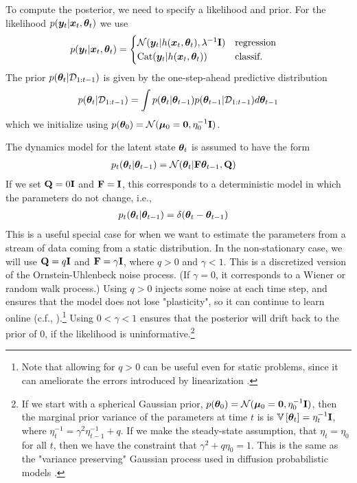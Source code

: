 To compute the posterior, we need to specify a likelihood and prior. For the likelihood 
$p({\bm{y}}_t|{\bm{x}}_t,{\bm{\theta}}_t)$
we use
\begin{align}
    p(\vy_t|\vx_t,\vtheta_t) &= 
    \begin{cases}
    \gauss(\vy_t|h(\vx_t,\vtheta_t), \lambda^{-1}\vI)
     & \mbox{regression} \\
     \cat(\vy_t|h(\vx_t,\vtheta_t)) %
     & \mbox{classif.} 
    \end{cases}
    \label{eqn:likelihood}
\end{align}
The prior $p({\bm{\theta}}_t|{\mathcal{D}}_{1:t-1})$
is given by the one-step-ahead predictive distribution 
\begin{align}
p({\bm{\theta}}_t |{\mathcal{D}}_{1:t-1}) = \int p({\bm{\theta}}_t|{\bm{\theta}}_{t-1})
p({\bm{\theta}}_{t-1} | {\mathcal{D}}_{1:t-1}) d {\bm{\theta}}_{t-1}
\label{eqn:prior-predictive}
\end{align}
which we initialize using 
$p({\bm{\theta}}_0) = \mathcal{N}(\boldsymbol{\mu}_0=\boldsymbol{0}, \eta_0^{-1} \mathbf{I})$.

The dynamics model for  the latent state ${\bm{\theta}}_t$
is assumed to have the form 
\begin{align}
p_t({\bm{\theta}}_t|{\bm{\theta}}_{t-1}) &= 
\mathcal{N}({\bm{\theta}}_t  | \mathbf{F} {\bm{\theta}}_{t-1}, \mathbf{Q})
\label{eqn:dynamics}
\end{align}
If we set $\mathbf{Q} = 0 \mathbf{I}$ and $\mathbf{F}=\mathbf{I}$, this corresponds to a deterministic model in which the parameters do not change, i.e., 
\begin{align}
p_t({\bm{\theta}}_t|{\bm{\theta}}_{t-1}) &= 
\delta({\bm{\theta}}_t  - {\bm{\theta}}_{t-1}) \label{eq:stationary}
\end{align}
This is a useful special case for when we want to estimate the parameters from a stream of data coming from
a static distribution.
In the non-stationary case, 
we will use $\mathbf{Q} = q \mathbf{I}$ and $\mathbf{F} = \gamma \mathbf{I}$,
where $q >0$ and $\gamma<1$.
This  is a discretized version
of the Ornstein-Uhlenbeck noise process.
(If $\gamma=0$, it corresponds to a Wiener or random
walk process.)
Using $q>0$ injects some noise at each time step,
and ensures that the model does not lose
"plasticity", so it can continue to learn online (c.f., \citep{Ash2020,Dohare2021}).\footnote{
%
Note that allowing for $q>0$
can be useful even for static problems,
since it can ameliorate the errors
introduced by linearization \citep{Barrau2018}.
}
Using $0 < \gamma < 1$ ensures that
the posterior will drift back to the prior of 0,
if the  likelihood is uninformative.\footnote{
\label{ft:steady-state}
%
If we start with a spherical Gaussian prior,
$p({\bm{\theta}}_0) = \mathcal{N}(\boldsymbol{\mu}_0=\boldsymbol{0}, \eta_0^{-1} \mathbf{I})$,
then the marginal prior variance of the 
parameters at time $t$ is 
is $\mathbb{V}\left[ {{\bm{\theta}}_t}\right] = \eta_t^{-1} \mathbf{I}$,
where $\eta_t^{-1} = \gamma^2 \eta_{t-1}^{-1} + q$.
If we make the steady-state assumption,
that $\eta_t=\eta_0$ for all $t$,
then we have the constraint that 
$\gamma^{2}+q\eta_{0}=1$.
This is the same as the "variance preserving" Gaussian process used in diffusion probabilistic models
\citep{song2020score,ho2020denoising}.
}

